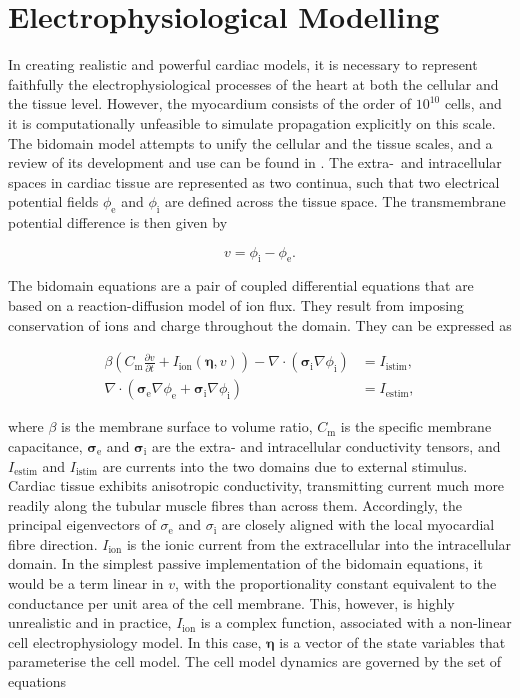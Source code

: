 \section{Electrophysiological Modelling}
\label{sec:electrophysiological_modelling}
  In creating realistic and powerful cardiac models, it is necessary to represent faithfully the electrophysiological processes of the heart at both the cellular and the tissue level. However, the myocardium consists of the order of $10^{10}$ cells, and it is computationally unfeasible to simulate propagation explicitly on this scale. The bidomain model attempts to unify the cellular and the tissue scales, and a review of its development and use can be found in \cite{Henriquez1993}. The extra-~and intracellular spaces in cardiac tissue are represented as two continua, such that two electrical potential fields $\phi_\text{e}$ and $\phi_\text{i}$ are defined across the tissue space. The transmembrane potential difference is then given by
  
  \begin{equation}
    v = \phi_\text{i} - \phi_\text{e}.
  \end{equation}
  
  The bidomain equations are a pair of coupled differential equations that are based on a reaction-diffusion model of ion flux. They result from imposing conservation of ions and charge throughout the domain. They can be expressed as
  
  \begin{align}
    \beta \left( C_\text{m}\frac{\partial v}{\partial t} + I_\text{ion}\left( \boldsymbol\eta, v \right) \right) - \nabla \cdot \left( \boldsymbol\sigma_\text{i} \nabla \phi_\text{i} \right) &= I_\text{istim}, \\
      \nabla \cdot \left( \boldsymbol\sigma_\text{e} \nabla \phi_\text{e} +  \boldsymbol\sigma_\text{i} \nabla \phi_\text{i} \right) &= I_\text{estim},
  \end{align}
  
  where $\beta$ is the membrane surface to volume ratio, $C_\text{m}$ is the specific membrane capacitance, $\boldsymbol\sigma_\text{e}$ and $\boldsymbol\sigma_\text{i}$ are the extra- and intracellular conductivity tensors, and $I_\text{estim}$ and $I_\text{istim}$ are currents into the two domains due to external stimulus. Cardiac tissue exhibits anisotropic conductivity, transmitting current much more readily along the tubular muscle fibres than across them. Accordingly, the principal eigenvectors of $\sigma_\text{e}$ and $\sigma_\text{i}$ are closely aligned with the local myocardial fibre direction. $I_\text{ion}$ is the ionic current from the extracellular into the intracellular domain. In the simplest passive implementation of the bidomain equations, it would be a term linear in $v$, with the proportionality constant equivalent to the conductance per unit area of the cell membrane. This, however, is highly unrealistic and in practice, $I_\text{ion}$ is a complex function, associated with a non-linear cell electrophysiology model. In this case, $\boldsymbol\eta$ is a vector of the state variables that parameterise the cell model. The cell model dynamics are governed by the set of equations
  
